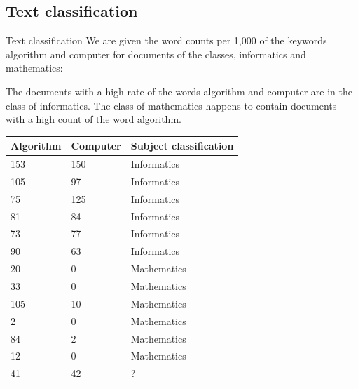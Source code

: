 \documentclass{beamer}
\begin{document}
\subsection{Text classification}

\begin{frame}{Text classification}\vspace{10pt}
We are given the word counts per 1,000 of the keywords algorithm and computer for documents of
the classes, informatics and mathematics:

The documents with a high rate of the words algorithm and computer are in the class of
informatics. The class of mathematics happens to contain documents with a high count
of the word algorithm.
    
\end{frame}

\begin{frame}
    \begin{table}[]
\begin{tabular}{@{}l{}l@{}l}
\toprule
Algorithm   & Computer  & Subject classification \\ \midrule
153 & 150 & Informatics                                        \\
105 &97 &Informatics                                        \\
75 &125& Informatics                                        \\
81& 84& Informatics                                        \\
73 &77& Informatics                                        \\
90 &63& Informatics                                        \\
20 &0 &Mathematics                                        \\
33 &0 &Mathematics                                        \\
105 &10& Mathematics                                        \\
2 &0 &Mathematics                                        \\
84& 2& Mathematics                                        \\
12& 0& Mathematics                                        \\
41 &42& \alert{?}  \\ \bottomrule                  
\end{tabular}
\end{table}
\end{frame}
\end{document}
